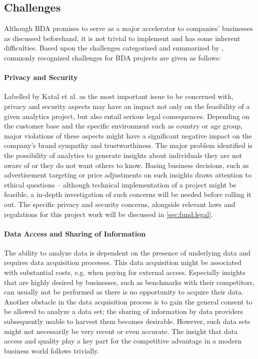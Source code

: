 \subsection{Challenges}
\label{sota-bda-challenges}

Although \ac{BDA} promises to serve as a major accelerator to companies' businesses as discussed beforehand, it is not trivial to implement and has some inherent difficulties. Based upon the challenges categorized and summarized by \autocite[p.~406\psq]{katal2013bd}, commonly recognized challenges for \ac{BDA} projects are given as follows:

\paragraph{Privacy and Security}
Labelled by Katal et al. as the most important issue to be concerned with, privacy and security aspects may have an impact not only on the feasibility of a given analytics project, but also entail serious legal consequences. Depending on the customer base and the specific environment such as country or age group, major violations of these aspects might have a significant negative impact on the company's brand sympathy and trustworthiness. The major problem identified is the possibility of analytics to generate insights about individuals they are not aware of or they do not want others to know. Basing business decisions, such as advertisement targeting or price adjustments on such insights draws attention to ethical questions -- although technical implementation of a project might be feasible, a in-depth investigation of such concerns will be needed before rolling it out. The specific privacy and security concerns, alongside relevant laws and regulations for this project work will be discussed in \vref{sec:fund:legal}.

\paragraph{Data Access and Sharing of Information}
The ability to analyze data is dependent on the presence of underlying data and requires data acquisition processes. This data acquisition might be associated with substantial costs, e.g. when paying for external access. Especially insights that are highly desired by businesses, such as benchmarks with their competitors, can usually not be performed as there is no opportunity to acquire their data. Another obstacle in the data acquisition process is to gain the general consent to be allowed to analyze a data set; the sharing of information by data providers subsequently usable to harvest them becomes desirable. However, such data sets might not necessarily be very recent or even accurate. The insight that data access and quality play a key part for the competitive advantage in a modern business world follows trivially.

